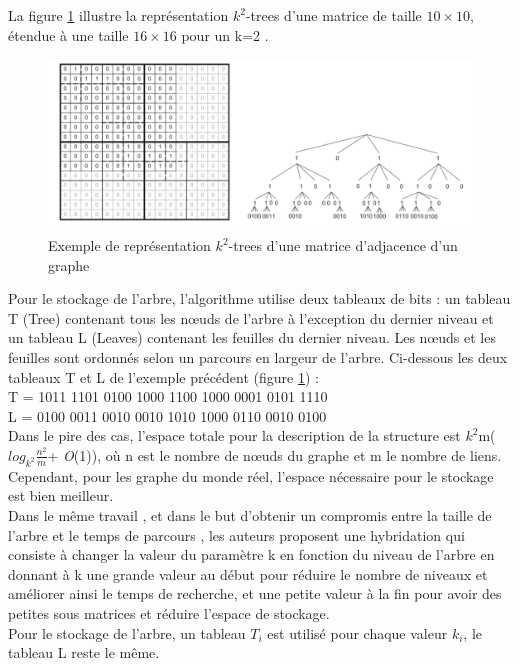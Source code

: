 La figure \ref{k2-trees-exemples} illustre la représentation $k^2$-trees d'une matrice de taille $10 \times 10$, étendue à une  taille $16 \times 16$ pour un k=2 \citep{brisaboa2015efficient}.

\begin{figure}[H]
\begin{center}
\includegraphics[height=200 pt, width=450 pt]{./ressources/image/k2-trees.png} 
\end{center}
\caption{Exemple de représentation $k^2$-trees d'une matrice d'adjacence d'un graphe}
\label{k2-trees-exemples}
\end{figure}


Pour le stockage de l'arbre, l'algorithme utilise deux tableaux de bits : un tableau T (Tree) contenant tous les nœuds de l'arbre à l'exception du dernier niveau et un tableau L (Leaves) contenant les feuilles du dernier niveau. Les nœuds et les feuilles sont ordonnés selon un parcours en largeur de l'arbre.   
Ci-dessous les deux tableaux T et L de l'exemple précédent (figure \ref{k2-trees-exemples}) : \\
T = 1011 1101 0100 1000 1100 1000 0001 0101 1110\\
L = 0100 0011 0010 0010 1010 1000 0110 0010 0100\\
Dans le pire des cas, l'espace totale pour la description de la structure est $k^2$m($log_{k^2}\frac{n^2}{m}$+ \textit{O}(1)), où n est le nombre de nœuds du graphe et m le nombre de liens. Cependant, pour les graphe du monde réel, l'espace nécessaire pour le stockage est bien meilleur. \\

Dans le même travail \citep{brisaboa2009k}, et dans le but d'obtenir un compromis entre la taille de l'arbre et le temps de parcours , les auteurs proposent une hybridation qui consiste à changer la valeur du paramètre k en fonction du niveau de l'arbre en donnant à k une grande valeur au début pour réduire le nombre de niveaux et améliorer ainsi le temps de recherche, et une petite valeur à la fin pour avoir des petites sous matrices et réduire l'espace de stockage.\\
Pour le stockage de l'arbre, un tableau $T_{i}$ est utilisé pour chaque valeur $k_{i}$, le tableau L reste le même.\\


